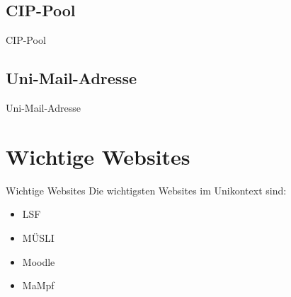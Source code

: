 
\subsection{CIP-Pool}
\begin{frame}{CIP-Pool}
\end{frame}


\subsection{Uni-Mail-Adresse}
\begin{frame}{Uni-Mail-Adresse}
\end{frame}


\section{Wichtige Websites}
\begin{frame}{Wichtige Websites}
    \large Die wichtigsten Websites im Unikontext sind:
    \begin{itemize}
        \item{LSF}
        \item{MÜSLI}
        \item{Moodle}
        \item{MaMpf}
    \end{itemize}
\end{frame}


